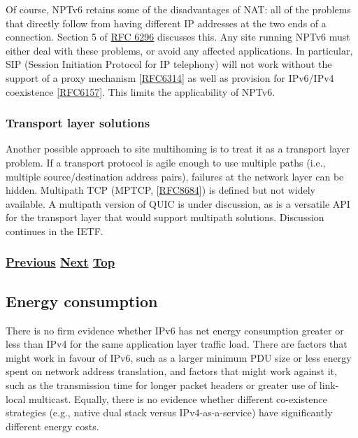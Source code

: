 \documentclass[
]{article}
\begin{document}
Of course, NPTv6 retains some of the disadvantages of NAT: all of the
problems that directly follow from having different IP addresses at the
two ends of a connection. Section 5 of
\href{https://www.rfc-editor.org/info/rfc6296}{RFC 6296} discusses this.
Any site running NPTv6 must either deal with these problems, or avoid
any affected applications. In particular, SIP (Session Initiation
Protocol for IP telephony) will not work without the support of a proxy
mechanism {[}\href{https://www.rfc-editor.org/info/rfc6314}{RFC6314}{]}
as well as provision for IPv6/IPv4 coexistence
{[}\href{https://www.rfc-editor.org/info/rfc6157}{RFC6157}{]}. This
limits the applicability of NPTv6.

\subsubsection{Transport layer
solutions}\label{transport-layer-solutions}

Another possible approach to site multihoming is to treat it as a
transport layer problem. If a transport protocol is agile enough to use
multiple paths (i.e., multiple source/destination address pairs),
failures at the network layer can be hidden. Multipath TCP (MPTCP,
{[}\href{https://www.rfc-editor.org/info/rfc8684}{RFC8684}{]}) is
defined but not widely available. A multipath version of QUIC is under
discussion, as is a versatile API for the transport layer that would
support multipath solutions. Discussion continues in the IETF.

\subsubsection{\texorpdfstring{\hyperref[multi-prefix-operation]{Previous}
\hyperref[energy-consumption]{Next}
\hyperref[management-and-operations]{Top}}{Previous Next Top}}\label{previous-next-top-31}

\pagebreak

\subsection{Energy consumption}\label{energy-consumption}

There is no firm evidence whether IPv6 has net energy consumption
greater or less than IPv4 for the same application layer traffic load.
There are factors that might work in favour of IPv6, such as a larger
minimum PDU size or less energy spent on network address translation,
and factors that might work against it, such as the transmission time
for longer packet headers or greater use of link-local multicast.
Equally, there is no evidence whether different co-existence strategies
(e.g., native dual stack versus IPv4-as-a-service) have significantly
different energy costs.
\end{document}
